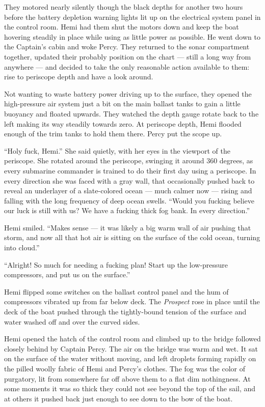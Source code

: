 \documentclass[
]{scrbook}
\begin{document}
They motored nearly silently though the black depths for another two
hours before the battery depletion warning lights lit up on the
electrical system panel in the control room. Hemi had them shut the
motors down and keep the boat hovering steadily in place while using as
little power as possible. He went down to the Captain's cabin and woke
Percy. They returned to the sonar compartment together, updated their
probably position on the chart --- still a long way from anywhere ---
and decided to take the only reasonable action available to them: rise
to periscope depth and have a look around.

Not wanting to waste battery power driving up to the surface, they
opened the high-pressure air system just a bit on the main ballast tanks
to gain a little buoyancy and floated upwards. They watched the depth
gauge rotate back to the left making its way steadily towards zero. At
periscope depth, Hemi flooded enough of the trim tanks to hold them
there. Percy put the scope up.

``Holy fuck, Hemi.'' She said quietly, with her eyes in the viewport of
the periscope. She rotated around the periscope, swinging it around 360
degrees, as every submarine commander is trained to do their first day
using a periscope. In every direction she was faced with a gray wall,
that occasionally pushed back to reveal an underlayer of a slate-colored
ocean --- much calmer now --- rising and falling with the long frequency
of deep ocean swells. ``Would you fucking believe our luck is still with
us? We have a fucking thick fog bank. In every direction.''

Hemi smiled. ``Makes sense --- it was likely a big warm wall of air
pushing that storm, and now all that hot air is sitting on the surface
of the cold ocean, turning into cloud.''

``Alright! So much for needing a fucking plan! Start up the low-pressure
compressors, and put us on the surface.''

Hemi flipped some switches on the ballast control panel and the hum of
compressors vibrated up from far below deck. The \emph{Prospect} rose in
place until the deck of the boat pushed through the tightly-bound
tension of the surface and water washed off and over the curved sides.

Hemi opened the hatch of the control room and climbed up to the bridge
followed closely behind by Captain Percy. The air on the bridge was warm
and wet. It sat on the surface of the water without moving, and left
droplets forming rapidly on the pilled woolly fabric of Hemi and Percy's
clothes. The fog was the color of purgatory, lit from somewhere far off
above them to a flat dim nothingness. At some moments it was so thick
they could not see beyond the top of the sail, and at others it pushed
back just enough to see down to the bow of the boat.
\end{document}
